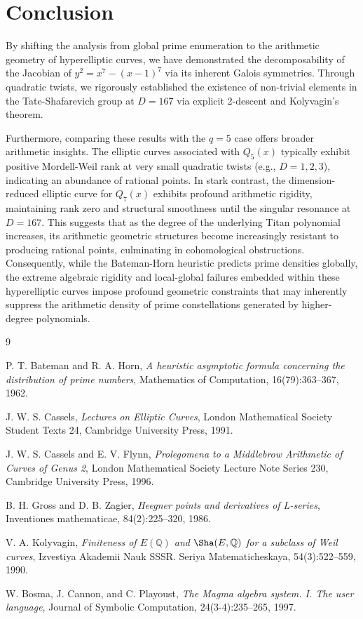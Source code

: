 \documentclass[11pt,a4paper]{article}
\begin{document}
\section{Conclusion}

By shifting the analysis from global prime enumeration to the arithmetic geometry of hyperelliptic curves, we have demonstrated the decomposability of the Jacobian of $y^2 = x^7 - (x-1)^7$ via its inherent Galois symmetries. Through quadratic twists, we rigorously established the existence of non-trivial elements in the Tate-Shafarevich group at $D=167$ via explicit 2-descent and Kolyvagin's theorem. 

Furthermore, comparing these results with the $q=5$ case offers broader arithmetic insights. The elliptic curves associated with $Q_5(x)$ typically exhibit positive Mordell-Weil rank at very small quadratic twists (e.g., $D=1, 2, 3$), indicating an abundance of rational points. In stark contrast, the dimension-reduced elliptic curve for $Q_7(x)$ exhibits profound arithmetic rigidity, maintaining rank zero and structural smoothness until the singular resonance at $D=167$. This suggests that as the degree of the underlying Titan polynomial increases, its arithmetic geometric structures become increasingly resistant to producing rational points, culminating in cohomological obstructions. Consequently, while the Bateman-Horn heuristic predicts prime densities globally, the extreme algebraic rigidity and local-global failures embedded within these hyperelliptic curves impose profound geometric constraints that may inherently suppress the arithmetic density of prime constellations generated by higher-degree polynomials.

\begin{thebibliography}{9}

P. T. Bateman and R. A. Horn,
\textit{A heuristic asymptotic formula concerning the distribution of prime numbers},
Mathematics of Computation, 16(79):363--367, 1962.

J. W. S. Cassels,
\textit{Lectures on Elliptic Curves},
London Mathematical Society Student Texts 24, Cambridge University Press, 1991.

J. W. S. Cassels and E. V. Flynn,
\textit{Prolegomena to a Middlebrow Arithmetic of Curves of Genus 2},
London Mathematical Society Lecture Note Series 230, Cambridge University Press, 1996.

B. H. Gross and D. B. Zagier,
\textit{Heegner points and derivatives of L-series},
Inventiones mathematicae, 84(2):225--320, 1986.

V. A. Kolyvagin,
\textit{Finiteness of $E(\mathbb{Q})$ and $\Sha(E,\mathbb{Q})$ for a subclass of Weil curves},
Izvestiya Akademii Nauk SSSR. Seriya Matematicheskaya, 54(3):522--559, 1990.

W. Bosma, J. Cannon, and C. Playoust,
\textit{The Magma algebra system. I. The user language},
Journal of Symbolic Computation, 24(3-4):235--265, 1997.

\end{thebibliography}
\end{document}
